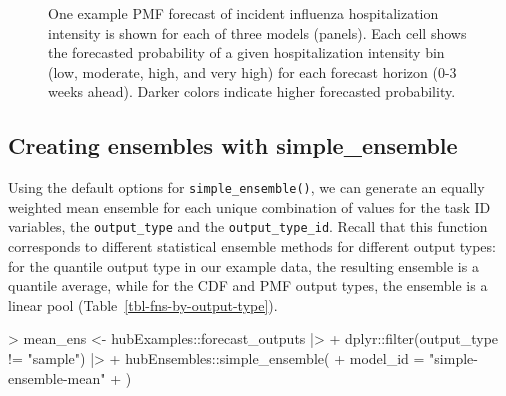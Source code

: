 \documentclass[
]{article}
\newenvironment{Shaded}{\begin{snugshade}}{\end{snugshade}}
\newcommand{\AttributeTok}[1]{\textcolor[rgb]{0.40,0.45,0.13}{#1}}
\newcommand{\FunctionTok}[1]{\textcolor[rgb]{0.28,0.35,0.67}{#1}}
\newcommand{\NormalTok}[1]{\textcolor[rgb]{0.00,0.23,0.31}{#1}}
\newcommand{\OtherTok}[1]{\textcolor[rgb]{0.00,0.23,0.31}{#1}}
\newcommand{\SpecialCharTok}[1]{\textcolor[rgb]{0.37,0.37,0.37}{#1}}
\newcommand{\StringTok}[1]{\textcolor[rgb]{0.13,0.47,0.30}{#1}}
\begin{document}
\begin{figure}


\caption{\label{fig-plot-ex-mods-pmf}One example PMF forecast of
incident influenza hospitalization intensity is shown for each of three
models (panels). Each cell shows the forecasted probability of a given
hospitalization intensity bin (low, moderate, high, and very high) for
each forecast horizon (0-3 weeks ahead). Darker colors indicate higher
forecasted probability.}

\end{figure}%

\subsection{Creating ensembles with
simple\_ensemble}\label{creating-ensembles-with-simple_ensemble}

Using the default options for \texttt{simple\_ensemble()}, we can
generate an equally weighted mean ensemble for each unique combination
of values for the task ID variables, the \texttt{output\_type} and the
\texttt{output\_type\_id}. Recall that this function corresponds to
different statistical ensemble methods for different output types: for
the quantile output type in our example data, the resulting ensemble is
a quantile average, while for the CDF and PMF output types, the ensemble
is a linear pool (Table~\ref{tbl-fns-by-output-type}).

\begin{Shaded}
\begin{Highlighting}[]
\SpecialCharTok{\textgreater{}}\NormalTok{ mean\_ens }\OtherTok{\textless{}{-}}\NormalTok{ hubExamples}\SpecialCharTok{::}\NormalTok{forecast\_outputs }\SpecialCharTok{|\textgreater{}}
\SpecialCharTok{+}\NormalTok{   dplyr}\SpecialCharTok{::}\FunctionTok{filter}\NormalTok{(output\_type }\SpecialCharTok{!=} \StringTok{"sample"}\NormalTok{) }\SpecialCharTok{|\textgreater{}}
\SpecialCharTok{+}\NormalTok{   hubEnsembles}\SpecialCharTok{::}\FunctionTok{simple\_ensemble}\NormalTok{(}
\SpecialCharTok{+}     \AttributeTok{model\_id =} \StringTok{"simple{-}ensemble{-}mean"}
\SpecialCharTok{+}\NormalTok{   )}
\end{Highlighting}
\end{Shaded}
\end{document}

